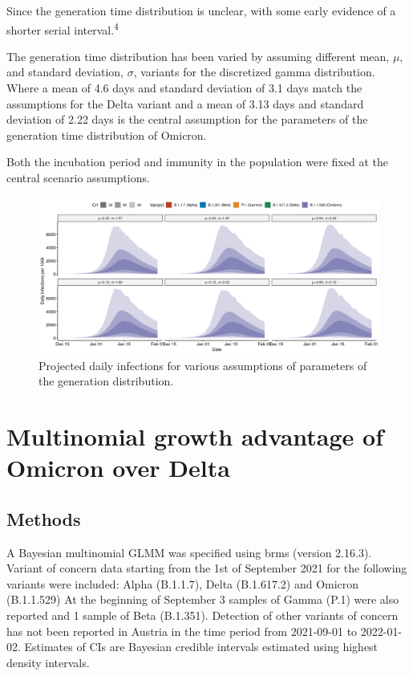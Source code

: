 \documentclass[
]{article}
\begin{document}
Since the generation time distribution is unclear, with some early evidence of a shorter serial interval.\textsuperscript{4}

The generation time distribution has been varied by assuming different mean, \(\mu\),
and standard deviation, \(\sigma\), variants for the discretized gamma distribution.
Where a mean of 4.6 days and standard deviation of 3.1 days match the assumptions for the Delta variant
and a mean of 3.13 days and standard deviation of 2.22 days is the central
assumption for the parameters of the generation time distribution of Omicron.

Both the incubation period and immunity in the population were fixed at the
central scenario assumptions.

\begin{figure}
\includegraphics[width=1\linewidth]{omicron_austria_files/figure-latex/generation-time-scenarios-1} \caption{Projected daily infections for various assumptions of parameters of the generation distribution.}\label{fig:generation-time-scenarios}
\end{figure}

\hypertarget{multinomial-growth-advantage-of-omicron-over-delta}{%
\section{Multinomial growth advantage of Omicron over Delta}\label{multinomial-growth-advantage-of-omicron-over-delta}}

\hypertarget{methods-1}{%
\subsection{Methods}\label{methods-1}}

A Bayesian multinomial GLMM was specified using brms (version 2.16.3). Variant of concern data starting from the 1st of September 2021 for the following variants were included: Alpha (B.1.1.7), Delta (B.1.617.2) and Omicron (B.1.1.529) At the beginning of September 3 samples of Gamma (P.1) were also reported and 1 sample of Beta (B.1.351). Detection of other variants of concern has not been reported in Austria in the time period from 2021-09-01 to 2022-01-02. Estimates of CIs are Bayesian credible intervals estimated using highest density intervals.
\end{document}
